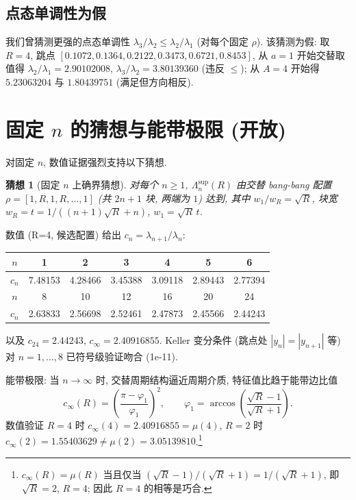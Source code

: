 \documentclass[UTF8]{ctexart}
\newtheorem{conjecture}[theorem]{猜想}
\begin{document}
\subsection{点态单调性为假}

我们曾猜测更强的点态单调性 $\lambda_3/\lambda_2 \leq \lambda_2/\lambda_1$ (对每个固定 $\rho$).
该猜测为假: 取 $R = 4$, 跳点 $[0.1072, 0.1364, 0.2122, 0.3473, 0.6721, 0.8453]$,
从 $a = 1$ 开始交替取值得 $\lambda_2/\lambda_1 = 2.90102008$, $\lambda_3/\lambda_2 = 3.80139360$
(违反 $\leq$); 从 $A = 4$ 开始得 $5.23063204$ 与 $1.80439751$ (满足但方向相反).

\section{固定 \texorpdfstring{$n$}{n} 的猜想与能带极限 (开放)}

对固定 $n$, 数值证据强烈支持以下猜想.

\begin{conjecture}[固定 $n$ 上确界猜想]
对每个 $n \geq 1$, $\Lambda_n^{\sup}(R)$ 由交替 bang-bang 配置
$\rho = [1, R, 1, R, \dots, 1]$ (共 $2n+1$ 块, 两端为 $1$) 达到, 其中
$w_1/w_R = \sqrt{R}$, 块宽 $w_R = t = 1/((n+1)\sqrt{R}+n)$,
$w_1 = \sqrt{R}\,t$.
\end{conjecture}

数值 (R=4, 候选配置) 给出 $c_n = \lambda_{n+1}/\lambda_n$:

\begin{center}
\begin{tabular}{ccccccc}
	\toprule
	$n$ & 1 & 2 & 3 & 4 & 5 & 6 \\
	\midrule
	$c_n$ & 7.48153 & 4.28466 & 3.45388 & 3.09118 & 2.89443 & 2.77394 \\
	\midrule
	$n$ & 8 & 10 & 12 & 16 & 20 & 24 \\
	$c_n$ & 2.63833 & 2.56698 & 2.52461 & 2.47873 & 2.45566 & 2.44243 \\
	\bottomrule
\end{tabular}
\end{center}

以及 $c_{24} = 2.44243$, $c_{\infty} = 2.40916855$. Keller 变分条件 (跳点处 $|y_n| = |y_{n+1}|$ 等)
对 $n = 1, \dots, 8$ 已符号级验证吻合 (1e-11).

能带极限: 当 $n \to \infty$ 时, 交替周期结构逼近周期介质, 特征值比趋于能带边比值
\begin{equation}
	c_{\infty}(R) = \left( \frac{\pi - \varphi_1}{\varphi_1} \right)^2,
	\qquad \varphi_1 = \arccos\left( \frac{\sqrt{R}-1}{\sqrt{R}+1} \right).
\end{equation}
数值验证 $R = 4$ 时 $c_{\infty}(4) = 2.40916855 = \mu(4)$, $R = 2$ 时
$c_{\infty}(2) = 1.55403629 \neq \mu(2) = 3.05139810$.\footnote{$c_{\infty}(R) = \mu(R)$ 当且仅当 $(\sqrt{R}-1)/(\sqrt{R}+1) = 1/(\sqrt{R}+1)$, 即 $\sqrt{R} = 2$, $R = 4$; 因此 $R=4$ 的相等是巧合.}
\end{document}

